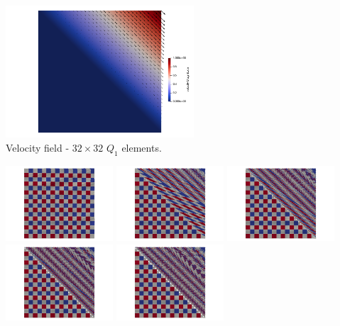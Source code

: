 \begin{center}
\includegraphics[width=7cm]{python_codes/fieldstone_30/results_couette/vel}\\
{\captionfont Velocity field - $32 \times 32$ $Q_1$ elements.}
\end{center}

\begin{center}
\includegraphics[width=4cm]{python_codes/fieldstone_30/results_couette/particles0000}
\includegraphics[width=4cm]{python_codes/fieldstone_30/results_couette/particles0010}
\includegraphics[width=4cm]{python_codes/fieldstone_30/results_couette/particles0020}\\
\includegraphics[width=4cm]{python_codes/fieldstone_30/results_couette/particles0030}
\includegraphics[width=4cm]{python_codes/fieldstone_30/results_couette/particles0040}

\end{center}
